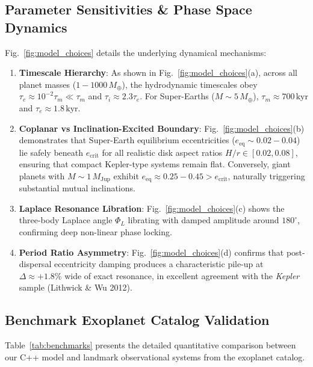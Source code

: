 \documentclass[11pt,a4paper]{article}
\begin{document}
\subsection{Parameter Sensitivities \& Phase Space Dynamics}
Fig.~\ref{fig:model_choices} details the underlying dynamical mechanisms:
\begin{enumerate}
    \item \textbf{Timescale Hierarchy}: As shown in Fig.~\ref{fig:model_choices}(a), across all planet masses ($1 - 1000\,M_\oplus$), the hydrodynamic timescales obey $\tau_e \approx 10^{-2} \tau_m \ll \tau_m$ and $\tau_i \approx 2.3 \tau_e$. For Super-Earths ($M \sim 5\,M_\oplus$), $\tau_m \approx 700\,\text{kyr}$ and $\tau_e \approx 1.8\,\text{kyr}$.
    \item \textbf{Coplanar vs Inclination-Excited Boundary}: Fig.~\ref{fig:model_choices}(b) demonstrates that Super-Earth equilibrium eccentricities ($e_{\text{eq}} \sim 0.02 - 0.04$) lie safely beneath $e_{\text{crit}}$ for all realistic disk aspect ratios $H/r \in [0.02, 0.08]$, ensuring that compact Kepler-type systems remain flat. Conversely, giant planets with $M \sim 1\,M_{\text{Jup}}$ exhibit $e_{\text{eq}} \approx 0.25 - 0.45 > e_{\text{crit}}$, naturally triggering substantial mutual inclinations.
    \item \textbf{Laplace Resonance Libration}: Fig.~\ref{fig:model_choices}(c) shows the three-body Laplace angle $\Phi_L$ librating with damped amplitude around $180^\circ$, confirming deep non-linear phase locking.
    \item \textbf{Period Ratio Asymmetry}: Fig.~\ref{fig:model_choices}(d) confirms that post-dispersal eccentricity damping produces a characteristic pile-up at $\Delta \approx +1.8\%$ wide of exact resonance, in excellent agreement with the \textit{Kepler} sample (Lithwick \& Wu 2012).
\end{enumerate}

\subsection{Benchmark Exoplanet Catalog Validation}
Table~\ref{tab:benchmarks} presents the detailed quantitative comparison between our C++ model and landmark observational systems from the exoplanet catalog.
\end{document}
